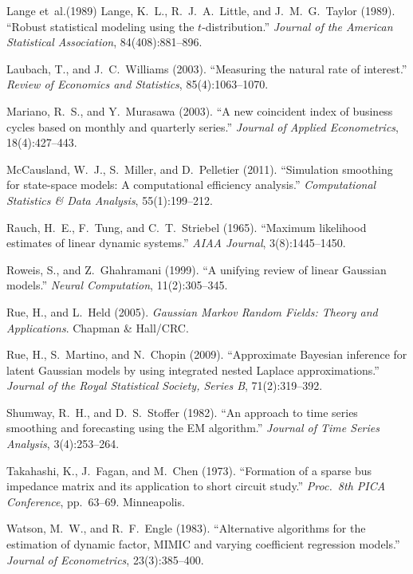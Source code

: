 \documentclass[11pt]{article}
\begin{document}
\begin{thebibliography}{Lange et~al.(1989)}
Lange, K.\ L., R.\ J.\ A.\ Little, and J.\ M.\ G.\ Taylor (1989).
``Robust statistical modeling using the $t$-distribution.''
\emph{Journal of the American Statistical Association},
84(408):881--896.

Laubach, T., and J.\ C.\ Williams (2003).
``Measuring the natural rate of interest.''
\emph{Review of Economics and Statistics}, 85(4):1063--1070.

Mariano, R.\ S., and Y.\ Murasawa (2003).
``A new coincident index of business cycles based on monthly and
quarterly series.''
\emph{Journal of Applied Econometrics}, 18(4):427--443.

McCausland, W.\ J., S.\ Miller, and D.\ Pelletier (2011).
``Simulation smoothing for state-space models: A computational
efficiency analysis.''
\emph{Computational Statistics \& Data Analysis}, 55(1):199--212.

Rauch, H.\ E., F.\ Tung, and C.\ T.\ Striebel (1965).
``Maximum likelihood estimates of linear dynamic systems.''
\emph{AIAA Journal}, 3(8):1445--1450.

Roweis, S., and Z.\ Ghahramani (1999).
``A unifying review of linear Gaussian models.''
\emph{Neural Computation}, 11(2):305--345.

Rue, H., and L.\ Held (2005).
\emph{Gaussian Markov Random Fields: Theory and Applications}.
Chapman \& Hall/CRC.

Rue, H., S.\ Martino, and N.\ Chopin (2009).
``Approximate Bayesian inference for latent Gaussian models by using
integrated nested Laplace approximations.''
\emph{Journal of the Royal Statistical Society, Series B},
71(2):319--392.

Shumway, R.\ H., and D.\ S.\ Stoffer (1982).
``An approach to time series smoothing and forecasting using the EM
algorithm.''
\emph{Journal of Time Series Analysis}, 3(4):253--264.

Takahashi, K., J.\ Fagan, and M.\ Chen (1973).
``Formation of a sparse bus impedance matrix and its application to
short circuit study.''
\emph{Proc.\ 8th PICA Conference}, pp.\ 63--69.  Minneapolis.

Watson, M.\ W., and R.\ F.\ Engle (1983).
``Alternative algorithms for the estimation of dynamic factor,
MIMIC and varying coefficient regression models.''
\emph{Journal of Econometrics}, 23(3):385--400.

\end{thebibliography}
\end{document}
